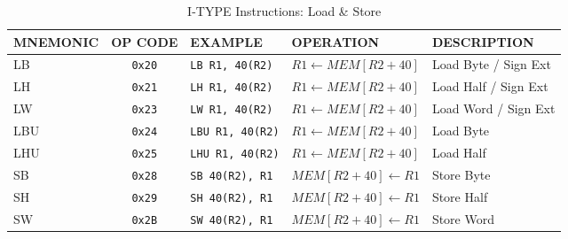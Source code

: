 \begin{table}[H]
\begin{tabularx}{\textwidth}{|l|c|l|l|X|}
    \hline
    MNEMONIC & OP CODE & EXAMPLE & OPERATION & DESCRIPTION \\ 
    \hline
    LB & \texttt{0x20} & \texttt{LB R1, 40(R2)} & $R1 \leftarrow MEM[ R2 + 40 ] $ & Load Byte / Sign Ext\\ 
    \hline
    LH & \texttt{0x21} & \texttt{LH R1, 40(R2)} & $R1 \leftarrow MEM[ R2 + 40 ] $ & Load Half / Sign Ext\\ 
    \hline
    LW & \texttt{0x23} & \texttt{LW R1, 40(R2)} & $R1 \leftarrow MEM[ R2 + 40 ] $ & Load Word / Sign Ext\\ 
    \hline
    LBU & \texttt{0x24} & \texttt{LBU R1, 40(R2)} & $R1 \leftarrow MEM[ R2 + 40 ] $ & Load Byte\\ 
    \hline
    LHU & \texttt{0x25} & \texttt{LHU R1, 40(R2)} & $R1 \leftarrow MEM[ R2 + 40 ] $ & Load Half\\ 
    \hline
    SB & \texttt{0x28} & \texttt{SB 40(R2), R1} & $MEM[ R2 + 40 ] \leftarrow R1 $ & Store Byte \\ 
    \hline
    SH & \texttt{0x29} & \texttt{SH 40(R2), R1} & $MEM[ R2 + 40 ] \leftarrow R1 $ & Store Half \\ 
    \hline
    SW & \texttt{0x2B} & \texttt{SW 40(R2), R1} & $MEM[ R2 + 40 ] \leftarrow R1 $ & Store Word \\ 
    \hline
\end{tabularx}
\caption{I-TYPE Instructions: Load \& Store}
\label{table:i_type_loadstore}
\end{table}

